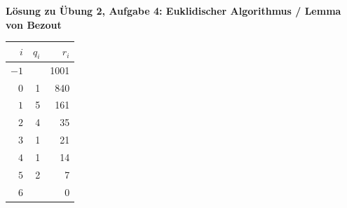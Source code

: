 \textbf{Lösung zu Übung 2, Aufgabe 4: Euklidischer Algorithmus / Lemma von Bezout}

\begin{loesung}
\begin{tabular}{r|rr}
\toprule
$i$ & $q_i$ & $r_i$\\
\midrule
$-1$ &     & 1001\\
$0$  & 1   & 840\\
$1$  & 5   & 161\\
$2$  & 4   & 35\\
$3$  & 1   & 21\\
$4$  & 1   & 14\\
$5$  & 2   & 7\\
$6$  &     & 0\\
\bottomrule
\end{tabular}


\end{loesung}
